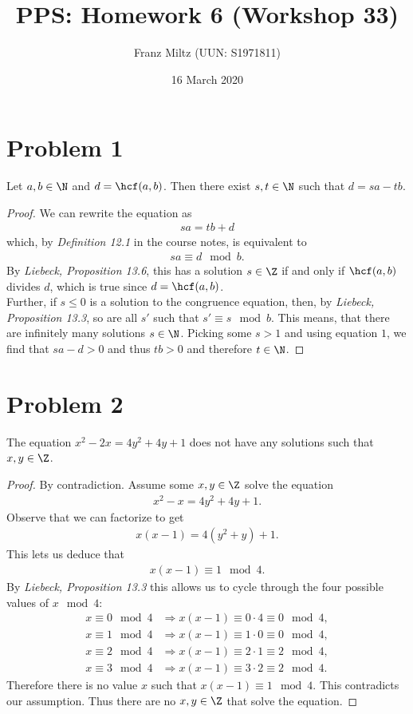 \documentclass{article}
\title{PPS: Homework 6 (Workshop 33)}
\author{Franz Miltz (UUN: S1971811)}
\date{16 March 2020}
\begin{document}
\maketitle
\section*{Problem 1}
\begin{claim}
	Let $a,b\in\N$ and $d=\hcf(a,b)$. Then there exist $s,t\in\N$ such that $d=sa-tb$.
\end{claim}
\begin{proof}
	We can rewrite the equation as
	\begin{align}
		\label{eq:1}
		sa = tb + d
	\end{align}
	which, by \emph{Definition 12.1} in the course notes, is equivalent to
	\begin{align*}
		sa \equiv d \mod b.
	\end{align*}
	By \emph{Liebeck, Proposition 13.6}, this has a solution $s\in\Z$ if and only if $\hcf(a,b)$ divides $d$, which is true since $d=\hcf(a,b)$.\\
	Further, if $s\leq 0$ is a solution to the congruence equation, then, by \emph{Liebeck, Proposition 13.3}, so are all $s'$ such that $s' \equiv s \mod b$.
	This means, that there are infinitely many solutions $s\in\N$.
	Picking some $s>1$ and using equation $1$, we find that $sa-d>0$ and thus $tb>0$ and therefore $t\in\N$.
\end{proof}
\section*{Problem 2}
\begin{claim}
	The equation $x^2-2x=4y^2+4y+1$ does not have any solutions such that $x,y\in\Z$.
\end{claim}
\begin{proof}
	By contradiction. Assume some $x,y\in\Z$ solve the equation
	\begin{align*}
		x^2-x=4y^2+4y+1.
	\end{align*}
	Observe that we can factorize to get
	\begin{align*}
		x(x-1)=4(y^2+y)+1.
	\end{align*}
	This lets us deduce that
	\begin{align*}
		x(x-1) \equiv 1 \mod 4.
	\end{align*}
	By \emph{Liebeck, Proposition 13.3} this allows us to cycle through the four possible values of $x\mod 4$:
	\begin{align*}
		x\equiv 0 \mod 4 & \Rightarrow x(x-1) \equiv 0\cdot 4 \equiv 0 \mod 4, \\
		x\equiv 1 \mod 4 & \Rightarrow x(x-1) \equiv 1\cdot 0 \equiv 0 \mod 4, \\
		x\equiv 2 \mod 4 & \Rightarrow x(x-1) \equiv 2\cdot 1 \equiv 2 \mod 4, \\
		x\equiv 3 \mod 4 & \Rightarrow x(x-1) \equiv 3\cdot 2 \equiv 2 \mod 4.
	\end{align*}
	Therefore there is no value $x$ such that $x(x-1)\equiv 1 \mod 4$.
	This contradicts our assumption.
	Thus there are no $x,y\in\Z$ that solve the equation.
\end{proof}
\end{document}
